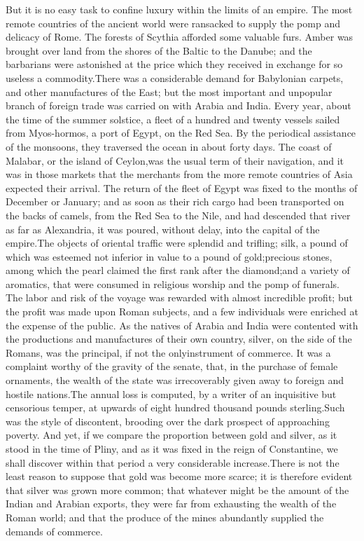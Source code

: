 But it is no easy task to confine luxury within the limits of an
empire. The most remote countries of the ancient world were
ransacked to supply the pomp and delicacy of Rome. The forests of
Scythia afforded some valuable furs. Amber was brought over land
from the shores of the Baltic to the Danube; and the barbarians
were astonished at the price which they received in exchange for
so useless a commodity.\footnotemark[101] There was a considerable demand for
Babylonian carpets, and other manufactures of the East; but the
most important and unpopular branch of foreign trade was carried
on with Arabia and India. Every year, about the time of the
summer solstice, a fleet of a hundred and twenty vessels sailed
from Myos-hormos, a port of Egypt, on the Red Sea. By the
periodical assistance of the monsoons, they traversed the ocean
in about forty days. The coast of Malabar, or the island of
Ceylon,\footnotemark[102] was the usual term of their navigation, and it was in
those markets that the merchants from the more remote countries
of Asia expected their arrival. The return of the fleet of Egypt
was fixed to the months of December or January; and as soon as
their rich cargo had been transported on the backs of camels,
from the Red Sea to the Nile, and had descended that river as far
as Alexandria, it was poured, without delay, into the capital of
the empire.\footnotemark[103] The objects of oriental traffic were splendid and
trifling; silk, a pound of which was esteemed not inferior in
value to a pound of gold;\footnotemark[104] precious stones, among which the
pearl claimed the first rank after the diamond;\footnotemark[105] and a variety
of aromatics, that were consumed in religious worship and the
pomp of funerals. The labor and risk of the voyage was rewarded
with almost incredible profit; but the profit was made upon Roman
subjects, and a few individuals were enriched at the expense of
the public. As the natives of Arabia and India were contented
with the productions and manufactures of their own country,
silver, on the side of the Romans, was the principal, if not the
only\footnotemark[1051] instrument of commerce. It was a complaint worthy of
the gravity of the senate, that, in the purchase of female
ornaments, the wealth of the state was irrecoverably given away
to foreign and hostile nations.\footnotemark[106] The annual loss is computed,
by a writer of an inquisitive but censorious temper, at upwards
of eight hundred thousand pounds sterling.\footnotemark[107] Such was the style
of discontent, brooding over the dark prospect of approaching
poverty. And yet, if we compare the proportion between gold and
silver, as it stood in the time of Pliny, and as it was fixed in
the reign of Constantine, we shall discover within that period a
very considerable increase.\footnotemark[108] There is not the least reason to
suppose that gold was become more scarce; it is therefore evident
that silver was grown more common; that whatever might be the
amount of the Indian and Arabian exports, they were far from
exhausting the wealth of the Roman world; and that the produce of
the mines abundantly supplied the demands of commerce.

